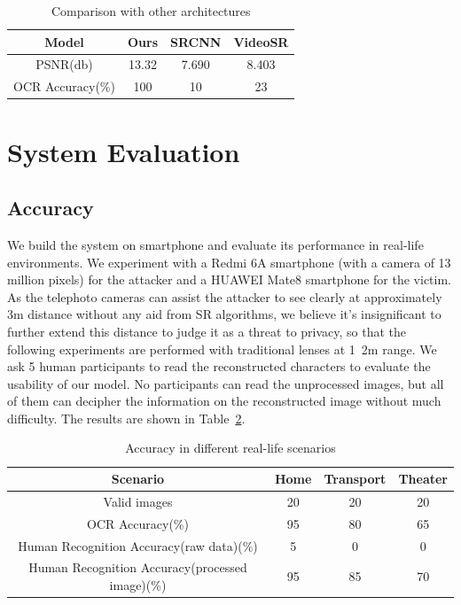 \begin{table}  
\begin{tabular}{c|c|c|c} 
Model & Ours & SRCNN & VideoSR \\ \hline
PSNR(db) & 13.32 & 7.690 & 8.403 \\ \hline
OCR Accuracy(\%) & 100 & 10 & 23 \\
\end{tabular} 
\caption{Comparison with other architectures}
\label{table-comp}
\end{table}

\section{System Evaluation}
\subsection{Accuracy}
We build the system on smartphone and evaluate its performance in real-life environments. We experiment with a Redmi 6A smartphone (with a camera of 13 million pixels) for the attacker and a HUAWEI Mate8 smartphone for the victim. As the telephoto cameras can assist the attacker to see clearly at approximately 3m distance without any aid from SR algorithms, we believe it's insignificant to further extend this distance to judge it as a threat to privacy, so that the following experiments are performed with traditional lenses at 1~2m range. We ask 5 human participants to read the reconstructed characters to evaluate the usability of our model. No participants can read the unprocessed images, but all of them can decipher the information on the reconstructed image without much difficulty. The results are shown in Table~\ref{table-accuracy}.

\begin{table}  
\begin{tabular}{c|c|c|c} 
Scenario & Home & Transport & Theater\\ \hline
Valid images & 20 & 20 & 20\\ \hline
OCR Accuracy(\%) & 95 & 80 & 65\\ \hline
Human Recognition Accuracy(raw data)(\%) & 5 & 0 & 0\\ \hline
Human Recognition Accuracy(processed image)(\%) & 95 & 85 & 70 \\
\end{tabular} 
\caption{Accuracy in different real-life scenarios}
\label{table-accuracy}
\end{table}

